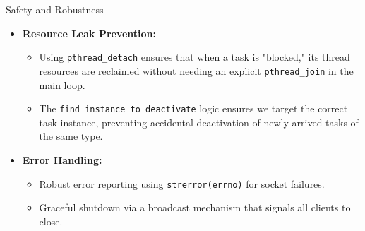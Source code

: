 
\begin{frame}{Safety and Robustness}
    \begin{itemize}
        \item \textbf{Resource Leak Prevention:}
        \begin{itemize}
            \item Using \texttt{pthread\_detach} ensures that when a task is "blocked," its thread resources are reclaimed without needing an explicit \texttt{pthread\_join} in the main loop.
            \item The \texttt{find\_instance\_to\_deactivate} logic ensures we target the correct task instance, preventing accidental deactivation of newly arrived tasks of the same type.
        \end{itemize}
        \item \textbf{Error Handling:} 
        \begin{itemize}
            \item Robust error reporting using \texttt{strerror(errno)} for socket failures.
            \item Graceful shutdown via a broadcast mechanism that signals all clients to close.
        \end{itemize}
    \end{itemize}
\end{frame}

